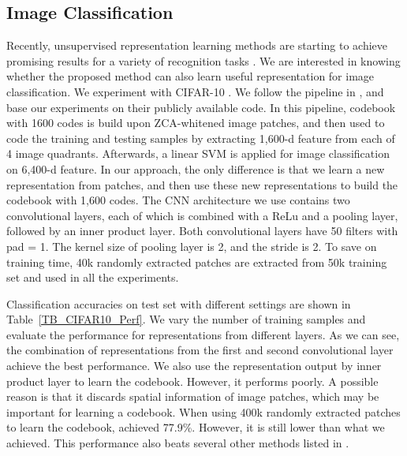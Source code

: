 \documentclass[10pt,twocolumn,letterpaper]{article}
\begin{document}
\subsection{Image Classification}
Recently, unsupervised representation learning methods are starting to achieve promising results for a variety of recognition tasks \cite{coates2011analysis, coates2011selecting, jia2012beyond, lin2014stable}. We are interested in knowing whether the proposed method can also learn useful representation for image classification. We experiment with CIFAR-10 \cite{krizhevsky2009learning}. We follow the pipeline in \cite{coates2011analysis}, and base our experiments on their publicly available code. In this pipeline, codebook with 1600 codes is build upon  ZCA-whitened image patches, and then used to code the training and testing samples by extracting 1,600-d feature from each of 4 image quadrants. Afterwards, a linear SVM \cite{cortes1995support} is applied for image classification on 6,400-d feature. In our approach, the only difference is that we learn a new representation from  patches, and then use these new representations to build the codebook with 1,600 codes. The CNN architecture we use contains two convolutional layers, each of which is combined with a ReLu and a pooling layer, followed by an inner product layer. Both convolutional layers have 50  filters with pad = 1. The kernel size of pooling layer is 2, and the stride is 2. To save on training time, 40k randomly extracted patches are extracted from 50k training set and used in all the experiments.

Classification accuracies on test set with different settings are shown in Table~\ref{TB_CIFAR10_Perf}. We vary the number of training samples and evaluate the performance for representations from different layers. As we can see, the combination of representations from the first and second convolutional layer achieve the best performance. {We also use the representation output by inner product layer to learn the codebook. However, it performs poorly. {A} possible reason is that it discards spatial information of image patches, which may be important for learning a codebook}. When using 400k randomly extracted patches to learn the codebook, \cite{coates2011analysis} achieved 77.9\%. However, it is still lower than what we achieved. This performance also beats several other methods listed in \cite{coates2011selecting, goodfellow2012spike, jia2012beyond, lin2014stable}.
\end{document}
